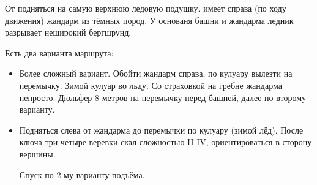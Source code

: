 От  подняться на самую верхнюю ледовую
подушку. \geoPeakKoronaOne[Башня] имеет справа (по ходу движения)
жандарм из тёмных пород. У основаня башни и жандарма ледник разрывает
неширокий бергшрунд.

Есть два варианта маршрута:

\begin{itemize}
\item Более сложный вариант. Обойти жандарм справа, по кулуару вылезти
на перемычку. Зимой кулуар во льду.  Со страховкой на
гребне жандарма непросто. Дюльфер 8 метров на перемычку перед башней,
далее по второму варианту.

\item Подняться слева от жандарма до перемычки по кулуару (зимой лёд).
После ключа три-четыре веревки скал сложностью II-IV, ориентироваться
в сторону вершины.

Спуск по 2-му варианту подъёма.
\end{itemize}